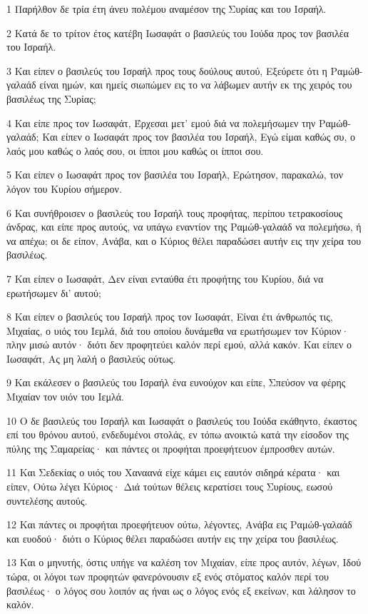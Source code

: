 \par 1 Παρήλθον δε τρία έτη άνευ πολέμου αναμέσον της Συρίας και του Ισραήλ.
\par 2 Κατά δε το τρίτον έτος κατέβη Ιωσαφάτ ο βασιλεύς του Ιούδα προς τον βασιλέα του Ισραήλ.
\par 3 Και είπεν ο βασιλεύς του Ισραήλ προς τους δούλους αυτού, Εξεύρετε ότι η Ραμώθ-γαλαάδ είναι ημών, και ημείς σιωπώμεν εις το να λάβωμεν αυτήν εκ της χειρός του βασιλέως της Συρίας;
\par 4 Και είπε προς τον Ιωσαφάτ, Έρχεσαι μετ' εμού διά να πολεμήσωμεν την Ραμώθ-γαλαάδ; Και είπεν ο Ιωσαφάτ προς τον βασιλέα του Ισραήλ, Εγώ είμαι καθώς συ, ο λαός μου καθώς ο λαός σου, οι ίπποι μου καθώς οι ίπποι σου.
\par 5 Και είπεν ο Ιωσαφάτ προς τον βασιλέα του Ισραήλ, Ερώτησον, παρακαλώ, τον λόγον του Κυρίου σήμερον.
\par 6 Και συνήθροισεν ο βασιλεύς του Ισραήλ τους προφήτας, περίπου τετρακοσίους άνδρας, και είπε προς αυτούς, να υπάγω εναντίον της Ραμώθ-γαλαάδ να πολεμήσω, ή να απέχω; οι δε είπον, Ανάβα, και ο Κύριος θέλει παραδώσει αυτήν εις την χείρα του βασιλέως.
\par 7 Και είπεν ο Ιωσαφάτ, Δεν είναι ενταύθα έτι προφήτης του Κυρίου, διά να ερωτήσωμεν δι' αυτού;
\par 8 Και είπεν ο βασιλεύς του Ισραήλ προς τον Ιωσαφάτ, Είναι έτι άνθρωπός τις, Μιχαίας, ο υιός του Ιεμλά, διά του οποίου δυνάμεθα να ερωτήσωμεν τον Κύριον· πλην μισώ αυτόν· διότι δεν προφητεύει καλόν περί εμού, αλλά κακόν. Και είπεν ο Ιωσαφάτ, Ας μη λαλή ο βασιλεύς ούτως.
\par 9 Και εκάλεσεν ο βασιλεύς του Ισραήλ ένα ευνούχον και είπε, Σπεύσον να φέρης Μιχαίαν τον υιόν του Ιεμλά.
\par 10 Ο δε βασιλεύς του Ισραήλ και Ιωσαφάτ ο βασιλεύς του Ιούδα εκάθηντο, έκαστος επί του θρόνου αυτού, ενδεδυμένοι στολάς, εν τόπω ανοικτώ κατά την είσοδον της πύλης της Σαμαρείας· και πάντες οι προφήται προεφήτευον έμπροσθεν αυτών.
\par 11 Και Σεδεκίας ο υιός του Χαναανά είχε κάμει εις εαυτόν σιδηρά κέρατα· και είπεν, Ούτω λέγει Κύριος· Διά τούτων θέλεις κερατίσει τους Συρίους, εωσού συντελέσης αυτούς.
\par 12 Και πάντες οι προφήται προεφήτευον ούτω, λέγοντες, Ανάβα εις Ραμώθ-γαλαάδ και ευοδού· διότι ο Κύριος θέλει παραδώσει αυτήν εις την χείρα του βασιλέως.
\par 13 Και ο μηνυτής, όστις υπήγε να καλέση τον Μιχαίαν, είπε προς αυτόν, λέγων, Ιδού τώρα, οι λόγοι των προφητών φανερόνουσιν εξ ενός στόματος καλόν περί του βασιλέως· ο λόγος σου λοιπόν ας ήναι ως ο λόγος ενός εξ εκείνων, και λάλησον το καλόν.
